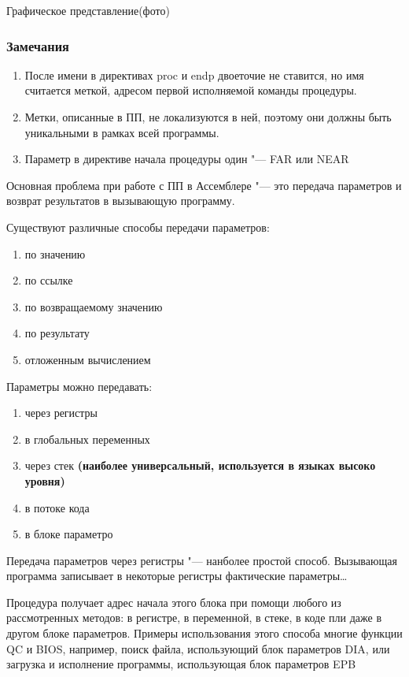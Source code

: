 Графическое представление(фото)

\subsubsection{Замечания}
\begin{enumerate}
    \item После имени в директивах proc и endp двоеточие не ставится, но имя считается меткой, адресом первой исполняемой команды процедуры.
    \item Метки, описанные в ПП, не локализуются в ней, поэтому они должны быть уникальными в рамках всей программы.
    \item Параметр в директиве начала процедуры один "--- FAR или NEAR
\end{enumerate}

Основная проблема при работе с ПП в Ассемблере "--- это передача параметров и возврат результатов в вызывающую программу.

Существуют различные способы передачи параметров: 
\begin{enumerate}
    \item по значению
    \item по ссылке 
    \item по возвращаемому значению
    \item по результату
    \item отложенным вычислением
\end{enumerate}
Параметры можно передавать: 
\begin{enumerate}
    \item через регистры
    \item в глобальных переменных
    \item через стек \textbf{(наиболее универсальный, используется в языках высоко уровня)}
    \item в потоке кода
    \item в блоке параметро
\end{enumerate}
Передача параметров через регистры "--- нанболее простой способ. Вызывающая программа записывает в некоторые регистры фактические параметры\dots

Процедура получает адрес начала этого блока при помощи любого из рассмотренных методов: в регистре, в переменной, в стеке, в коде пли даже в другом блоке параметров. Примеры использования этого способа многие функции QC и BIOS, например, поиск файла, использующий блок параметров DIA, или загрузка и исполнение программы, использующая блок параметров EPB

